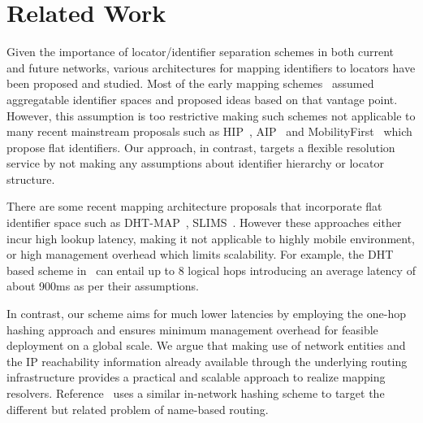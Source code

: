 \vspace{-0.15in}
\section{Related Work}
\label{sec:related}
Given the importance of locator/identifier separation schemes in both current and future networks, various architectures for mapping identifiers to locators have been proposed and studied. Most of the early mapping schemes~\cite{farinacci-alt,jen,jakab,mathy} assumed aggregatable identifier spaces and proposed ideas based on that vantage point. However, this assumption is too restrictive making such schemes not applicable to many recent mainstream proposals such as HIP~\cite{moskowitz}, AIP~\cite{andersen} and MobilityFirst~\cite{mobilityFirst} which propose flat identifiers. Our approach, in contrast, targets a flexible resolution service by not making any assumptions about identifier hierarchy or locator structure.

There are some recent mapping architecture proposals that incorporate flat identifier space such as DHT-MAP~\cite{luo}, SLIMS~\cite{hou}. However these approaches either incur high lookup latency, making it not applicable to highly mobile environment, or high
management overhead which limits scalability. For example, the DHT based scheme in~\cite{luo} can entail up to 8 logical hops introducing an average latency of about 900ms as per their assumptions.


In contrast, our scheme aims for much lower latencies by employing the one-hop hashing approach and ensures minimum management overhead for feasible deployment on a global scale. We argue that making use of network entities and the IP reachability information already available through the underlying routing infrastructure provides a practical and scalable approach to realize mapping resolvers. Reference~\cite{seattle_Kim} uses a similar in-network hashing scheme to target the different but related problem of name-based routing.

